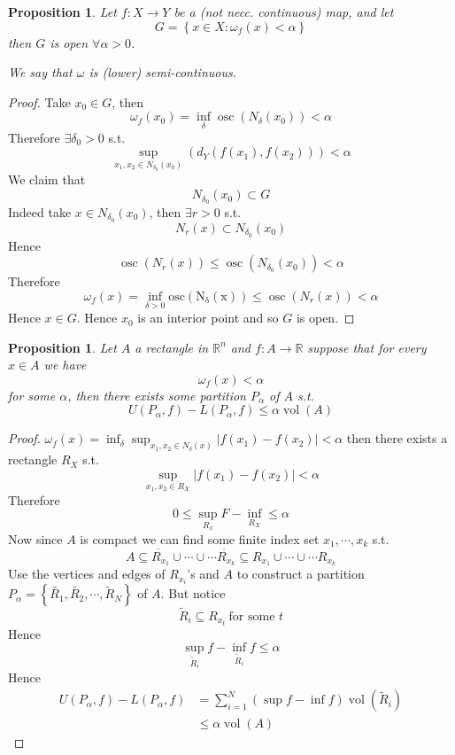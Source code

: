 \documentclass[11pt,a4paper]{article}
\theoremstyle{definition}
\theoremstyle{plain}
\newtheorem{proposition}[definition]{Proposition}
\theoremstyle{remark}
\newcommand{\R}{\mathbb{R}}
\renewcommand{\set}[1]{\left\{ #1 \right\}}
\newcommand{\abs}[1]{\lvert #1 \rvert}
\newcommand{\vol}{\operatorname{vol}}
\begin{document}
\begin{proposition}
    Let $f \colon X \to Y$ be a (not necc. continuous) map, and let 
    $$G = \set{x \in X \colon \omega_f (x) < \alpha}$$
    then $G$ is open $\forall \alpha > 0$.     

    We say that $\omega$ is (lower) semi-continuous.
\end{proposition}

\begin{proof}
    Take $x_0 \in G$, then 
    $$\omega_f (x_0) = \inf_{\delta} \operatorname{osc} (N_\delta(x_0)) < \alpha$$
    Therefore $\exists \delta_0 > 0$ s.t. 
    $$\sup_{x_1, x_2 \in N_{\delta_0 }(x_0)} (d_Y(f(x_1), f(x_2))) < \alpha$$
    We claim that 
    $$N_{\delta_0} (x_0) \subset G$$
    Indeed take $x \in N_{\delta_0} (x_0)$, then $\exists r > 0$ s.t. 
    $$N_r(x) \subset N_{\delta_0} (x_0)$$
    Hence 
    $$\operatorname{osc}(N_r(x)) \le \operatorname{osc} (N_{\delta_0} (x_0)) < \alpha$$
    Therefore 
    $$\omega_f (x) = \inf_{\delta > 0} \operatorname{osc (N_\delta(x))} \le \operatorname{osc} (N_r(x)) < \alpha$$
    Hence $x \in G$. Hence $x_0$ is an interior point and so $G$ is open. 
\end{proof}

\begin{proposition}
    Let $A$ a rectangle in $\R^n$ and $f \colon A \to \R$ suppose that for every $x \in A$ we have 
    $$\omega_f(x) < \alpha$$
    for some $\alpha$, then there exists some partition $P_\alpha$ of $A$ s.t. 
    $$U(P_\alpha, f) - L(P_\alpha,f) \le \alpha \vol (A)$$
\end{proposition}

\begin{proof}
    $\omega_f (x) = \inf_\delta \sup_{x_1, x_2 \in N_\delta(x)} \abs{f(x_1) - f(x_2)} < \alpha$ 
    then there exists a rectangle $R_X$ s.t. 
    $$\sup_{x_1, x_2 \in R_X} \abs{f(x_1) - f(x_2)} < \alpha$$
    Therefore 
    $$0 \le \sup_{R_x} F - \inf_{R_X} \le \alpha$$
    Now since $A$ is compact we can find some finite index set $x_1, \cdots, x_k$ s.t. 
    $$A \subseteq \mathring{R_{x_1}} \cup \cdots \cup \cdots \mathring{R_{x_k}} \subseteq R_{x_1} \cup \cdots \cup \cdots R_{x_k}$$
    Use the vertices and edges of $R_{x_i}$'s and $A$ to construct a partition 
    $P_\alpha = \set{\tilde{R_1}, \tilde{R_2}, \cdots, \tilde{R}_N}$ of $A$. But notice 
    $$\tilde{R}_i \subseteq R_{x_t} \ \text{for some $t$}$$
    Hence 
    $$\sup_{\tilde{R}_i} f - \inf_{\tilde{R}_i} f \le \alpha$$
    Hence 
    \begin{align*}
        U(P_\alpha, f) - L(P_\alpha, f) &= \sum_{i=1}^N (\sup f - \inf f) \vol (\tilde{R}_i) \\
        &\le \alpha \vol (A)
    \end{align*} 
\end{proof}
\end{document}
